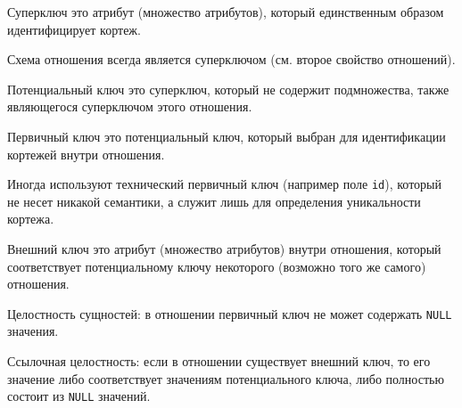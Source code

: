 \begin{definition}
  Суперключ это атрибут (множество атрибутов), который единственным образом
  идентифицирует кортеж.
\end{definition}

\begin{remark}
  Схема отношения всегда является суперключом (см. второе свойство отношений).
\end{remark}

\begin{definition}
  Потенциальный ключ это суперключ, который не содержит подмножества, также
  являющегося суперключом этого отношения.
\end{definition}

\begin{definition}
  Первичный ключ это потенциальный ключ, который выбран для идентификации
  кортежей внутри отношения.
\end{definition}

\begin{remark}
  Иногда используют технический первичный ключ (например поле \texttt{id}),
  который не несет никакой семантики, а служит лишь для определения уникальности
  кортежа.
\end{remark}

\begin{definition}
  Внешний ключ это атрибут (множество атрибутов) внутри отношения, который
  соответствует потенциальному ключу некоторого (возможно того же самого)
  отношения.
\end{definition}

\begin{definition}
  Целостность сущностей: в отношении первичный ключ не может содержать
  \texttt{NULL} значения.
\end{definition}

\begin{definition}
  Ссылочная целостность: если в отношении существует внешний ключ, то его
  значение либо соответствует значениям потенциального ключа, либо полностью
  состоит из \texttt{NULL} значений.
\end{definition}
